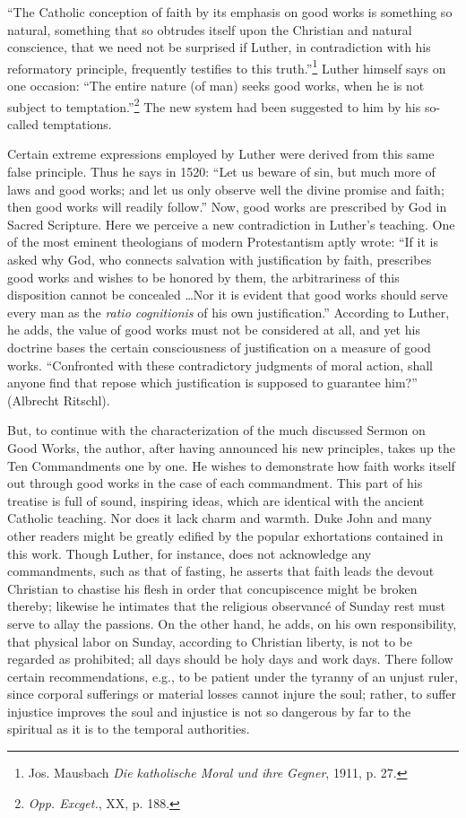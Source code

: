“The Catholic conception of faith by its emphasis on good works is something
so natural, something that so obtrudes itself upon the Christian and
natural conscience, that we need not be surprised if Luther, in contradiction
with his reformatory principle, frequently testifies to this truth.”\footnote
{Jos. Mausbach \textit{Die katholische Moral und ihre Gegner}, 1911, p. 27.}
Luther himself says on one occasion: “The entire nature (of man) seeks
good works, when he is not subject to temptation.”\footnote{\textit{Opp. Excget.}, XX, p. 188.}
The new system had been suggested to him by his so-called temptations.

Certain extreme expressions employed by Luther were derived from this
same false principle. Thus he says in 1520: “Let us beware of sin,
but much more of laws and good works; and let us only observe well the
divine promise and faith; then good works will readily follow.” Now,
good works are prescribed by God in Sacred Scripture. Here we perceive
a new contradiction in Luther’s teaching. One of the most eminent theologians
of modern Protestantism aptly wrote: “If it is asked why God, who
connects salvation with justification by faith, prescribes good works and
wishes to be honored by them, the arbitrariness of this disposition cannot be
concealed \dots Nor it is evident that good works should serve every man
as the \textit{ratio cognitionis} of his own justification.” According to Luther, he
adds, the value of good works must not be considered at all, and yet his
doctrine bases the certain consciousness of justification on a measure of good
works. “Confronted with these contradictory judgments of moral action,
shall anyone find that repose which justification is supposed to guarantee
him?” (Albrecht Ritschl).

But, to continue with the characterization of the much discussed
Sermon on Good Works, the author, after having announced his new
principles, takes up the Ten Commandments one by one. He wishes
to demonstrate how faith works itself out through good works in
the case of each commandment. This part of his treatise is full of sound,
inspiring ideas, which are identical with the ancient Catholic teaching.
Nor does it lack charm and warmth. Duke John and many other
readers might be greatly edified by the popular exhortations contained
in this work. Though Luther, for instance, does not acknowledge
any commandments, such as that of fasting, he asserts that
faith leads the devout Christian to chastise his flesh in order that concupiscence
might be broken thereby; likewise he intimates that the
religious observancé of Sunday rest must serve to allay the passions.
On the other hand, he adds, on his own responsibility, that physical
labor on Sunday, according to Christian liberty, is not
to be regarded as prohibited; all days should be holy days and work days.
There follow certain recommendations, e.g., to be patient under the
tyranny of an unjust ruler, since corporal sufferings or material losses
cannot injure the soul; rather, to suffer injustice improves the soul
and injustice is not so dangerous by far to the spiritual as it is to the
temporal authorities.

